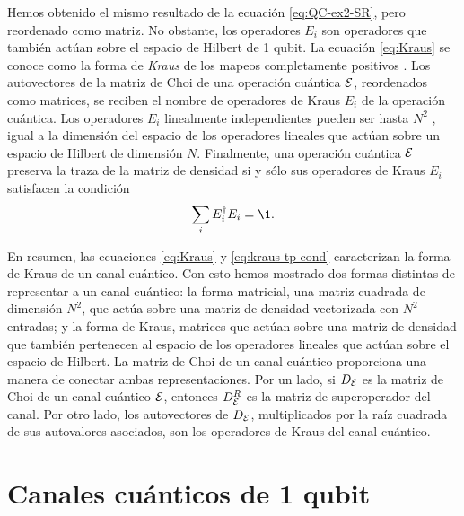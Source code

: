 Hemos obtenido el mismo resultado de la ecuación 
\eqref{eq:QC-ex2-SR}, pero reordenado como matriz. 
No obstante, los operadores $E_i$ son
operadores que también actúan sobre el espacio de Hilbert de 1 qubit. 
La ecuación \eqref{eq:Kraus} se conoce 
como la forma de \textit{Kraus} de los mapeos completamente positivos
\cite{bengtsson_zyczkowski_2017}.
Los autovectores de la matriz de Choi de una operación cuántica $\mathcal{E}$,
reordenados como matrices, se
reciben el nombre de operadores de Kraus $E_i$ de la operación cuántica.
Los operadores $E_i$ linealmente independientes  
pueden ser hasta $N^2$ \cite{nielsen_chuang_2011}, igual a la dimensión 
del espacio de los operadores lineales que actúan sobre un espacio de
Hilbert de dimensión $N$. 
Finalmente, una operación cuántica $\mathcal{E}$ preserva la traza de la matriz de densidad 
si y sólo sus operadores de Kraus $E_i$ satisfacen la condición
\cite{bengtsson_zyczkowski_2017}
\begin{align}
\sum_iE_i^{\dagger}E_i=\1.
\label{eq:kraus-tp-cond}
\end{align}

En resumen, las ecuaciones \eqref{eq:Kraus} y \eqref{eq:kraus-tp-cond}
caracterizan la forma de Kraus de un canal cuántico. 
Con esto hemos mostrado dos formas distintas de representar a un 
canal cuántico: la forma matricial, una matriz cuadrada
de dimensión $N^2$, que actúa sobre una matriz de densidad vectorizada 
con $N^2$ entradas; y la forma de Kraus, matrices que actúan sobre
una matriz de densidad que también pertenecen al espacio de 
los operadores lineales que actúan sobre el espacio de Hilbert. La matriz de 
Choi de un canal cuántico proporciona una manera de conectar ambas 
representaciones. Por un lado, si $D_{\mathcal{E}}$ es la matriz de Choi de un canal 
cuántico $\mathcal{E}$, entonces $D_{\mathcal{E}}^R$ es la matriz de superoperador
del canal.
Por otro lado, los autovectores de $D_{\mathcal{E}}$,
multiplicados por la raíz cuadrada de sus autovalores asociados,
son los operadores de Kraus del canal cuántico. 

\section{Canales cuánticos de 1 qubit} %

